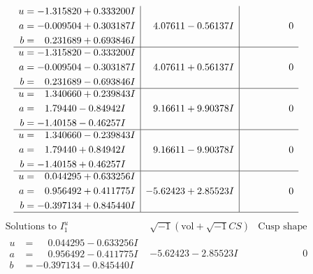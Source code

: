 \documentclass[1p]{elsarticle_modified}
\theoremstyle{definition}
\newcommand{\I}{\sqrt{-1}}
\begin{document}
$$\begin{array}{c|c|c}
\begin{aligned}
u &= -1.315820 + 0.333200 I \\
a &= -0.009504 + 0.303187 I \\
b &= \phantom{-}0.231689 + 0.693846 I\end{aligned}
 & \phantom{-}4.07611 - 0.56137 I & \phantom{-0.000000 } 0 \\ \hline\begin{aligned}
u &= -1.315820 - 0.333200 I \\
a &= -0.009504 - 0.303187 I \\
b &= \phantom{-}0.231689 - 0.693846 I\end{aligned}
 & \phantom{-}4.07611 + 0.56137 I & \phantom{-0.000000 } 0 \\ \hline\begin{aligned}
u &= \phantom{-}1.340660 + 0.239843 I \\
a &= \phantom{-}1.79440 - 0.84942 I \\
b &= -1.40158 - 0.46257 I\end{aligned}
 & \phantom{-}9.16611 + 9.90378 I & \phantom{-0.000000 } 0 \\ \hline\begin{aligned}
u &= \phantom{-}1.340660 - 0.239843 I \\
a &= \phantom{-}1.79440 + 0.84942 I \\
b &= -1.40158 + 0.46257 I\end{aligned}
 & \phantom{-}9.16611 - 9.90378 I & \phantom{-0.000000 } 0 \\ \hline\begin{aligned}
u &= \phantom{-}0.044295 + 0.633256 I \\
a &= \phantom{-}0.956492 + 0.411775 I \\
b &= -0.397134 + 0.845440 I\end{aligned}
 & -5.62423 + 2.85523 I & \phantom{-0.000000 } 0\\
 \hline 
 \end{array}$$\newpage$$\begin{array}{c|c|c}  
\text{Solutions to }I^u_{1}& \I (\text{vol} + \sqrt{-1}CS) & \text{Cusp shape}\\
 \hline 
\begin{aligned}
u &= \phantom{-}0.044295 - 0.633256 I \\
a &= \phantom{-}0.956492 - 0.411775 I \\
b &= -0.397134 - 0.845440 I\end{aligned}
 & -5.62423 - 2.85523 I & \phantom{-0.000000 } 0 \\ \hline\begin{aligned}

\end{aligned}
\end{array}$$
\end{document}
